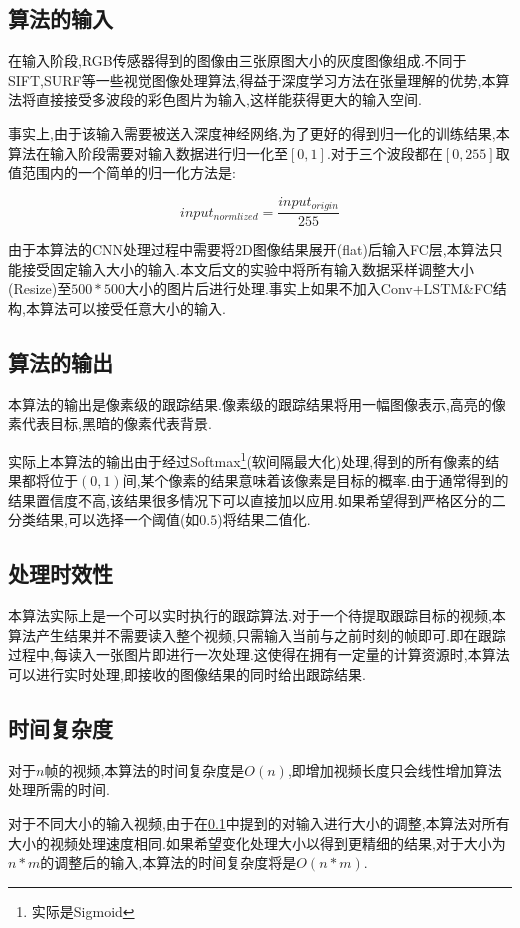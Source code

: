 \subsection{算法的输入} \label{section:input_of_our_algorithm}
\par
在输入阶段,RGB传感器得到的图像由三张原图大小的灰度图像组成.不同于SIFT\supercite{lowe1999object},SURF\supercite{bay2006surf}等一些视觉图像处理算法,得益于深度学习方法在张量理解的优势,本算法将直接接受多波段的彩色图片为输入,这样能获得更大的输入空间.
\par
事实上,由于该输入需要被送入深度神经网络,为了更好的得到归一化的训练结果,本算法在输入阶段需要对输入数据进行归一化至$[0,1]$.对于三个波段都在$[0,255]$取值范围内的一个简单的归一化方法是:
\par
\begin{equation}\label{equ:input_norm}  input_{normlized} = \frac{input_{origin}}{255}  \end{equation}
\par
由于本算法的CNN处理过程中需要将2D图像结果展开(flat)后输入FC层,本算法只能接受固定输入大小的输入.本文后文的实验中将所有输入数据采样调整大小(Resize)至$500*500$大小的图片后进行处理.事实上如果不加入Conv+LSTM\&FC结构,本算法可以接受任意大小的输入.
\par

\subsection{算法的输出}
本算法的输出是像素级的跟踪结果.像素级的跟踪结果将用一幅图像表示,高亮的像素代表目标,黑暗的像素代表背景.
\par
实际上本算法的输出由于经过Softmax\footnote{实际是Sigmoid}(软间隔最大化)处理,得到的所有像素的结果都将位于$(0,1)$间,某个像素的结果意味着该像素是目标的概率.由于通常得到的结果置信度不高,该结果很多情况下可以直接加以应用.如果希望得到严格区分的二分类结果,可以选择一个阈值(如$0.5$)将结果二值化.

\subsection{处理时效性}
本算法实际上是一个可以实时执行的跟踪算法.对于一个待提取跟踪目标的视频,本算法产生结果并不需要读入整个视频,只需输入当前与之前时刻的帧即可.即在跟踪过程中,每读入一张图片即进行一次处理.这使得在拥有一定量的计算资源时,本算法可以进行实时处理,即接收的图像结果的同时给出跟踪结果.

\subsection{时间复杂度}
对于$n$帧的视频,本算法的时间复杂度是$O(n)$,即增加视频长度只会线性增加算法处理所需的时间.
\par
对于不同大小的输入视频,由于在\ref{section:input_of_our_algorithm}中提到的对输入进行大小的调整,本算法对所有大小的视频处理速度相同.如果希望变化处理大小以得到更精细的结果,对于大小为$n*m$的调整后的输入,本算法的时间复杂度将是$O(n*m)$.


